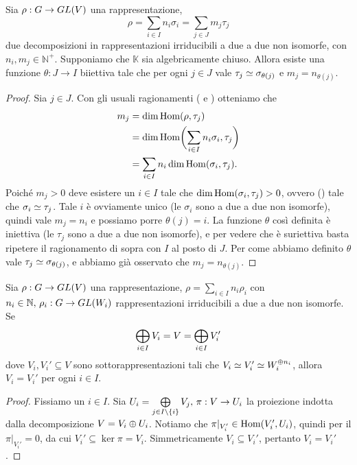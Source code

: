 \begin{proposition}
Sia $\rho:G\to GL(V)$ una rappresentazione,
$$
\rho=\sum_{i\in I}n_i\sigma_i=\sum_{j\in J}m_j\tau_j
$$
due decomposizioni in rappresentazioni irriducibili a due a due non isomorfe, con $n_i\comma m_j\in\mathbb{N}^+$. Supponiamo che $\mathbb{K}$ sia algebricamente chiuso. Allora esiste una funzione $\theta:J\to I$ biiettiva tale che per ogni $j\in J$ vale $\tau_j\simeq\sigma_{\theta(j)}$ e $m_j=n_{\theta(j)}$.
\end{proposition}
\begin{proof}
Sia $j\in J$. Con gli usuali ragionamenti ( e ) otteniamo che
\begin{align*}
m_j&=\dim\operatorname{Hom}(\rho,\tau_j)\\
&=\dim\operatorname{Hom}\biggl(\sum_{i\in I}n_i\sigma_i,\tau_j\biggr)\\
&=\sum_{i\in I}n_i\dim\operatorname{Hom}(\sigma_i,\tau_j).
\end{align*}
Poiché $m_j>0$ deve esistere un $i\in I$ tale che $\dim\operatorname{Hom}(\sigma_i,\tau_j)>0$, ovvero () tale che $\sigma_i\simeq\tau_j$. Tale $i$ è ovviamente unico (le $\sigma_i$ sono a due a due non isomorfe), quindi vale $m_j=n_i$ e possiamo porre $\theta(j)=i$. La funzione $\theta$ così definita è iniettiva (le $\tau_j$ sono a due a due non isomorfe), e per vedere che è suriettiva basta ripetere il ragionamento di sopra con $I$ al posto di $J$. Per come abbiamo definito $\theta$ vale $\tau_j\simeq\sigma_{\theta(j)}$, e abbiamo già osservato che $m_j=n_{\theta(j)}$.
\end{proof}

\begin{proposition}
Sia $\rho:G\to GL(V)$ una rappresentazione, $\rho=\sum_{i\in I}n_i\rho_i$ con $n_i\in\mathbb{N},\,\allowbreak\rho_i:G\to GL(W_i)$ rappresentazioni irriducibili a due a due non isomorfe. Se
$$
\bigoplus_{i\in I}V_i=V=\bigoplus_{i\in I}V_i'
$$
dove $V_i\comma V_i'\subseteq V$ sono sottorappresentazioni tali che $V_i\simeq V_i'\simeq W_i^{\oplus n_i}$, allora $V_i=V_i'$ per ogni $i\in I$.
\end{proposition}
\begin{proof}
Fissiamo un $i\in I$. Sia $U_i=\bigoplus\limits_{j\in I\setminus\{i\}}V_j,\,\allowbreak\pi:V\to U_i$ la proiezione indotta dalla decomposizione $V=V_i\oplus U_i$. Notiamo che $\pi|_{V_i'}\in\operatorname{Hom}(V_i',U_i)$, quindi per il  $\pi|_{V_i'}=0$, da cui $V_i'\subseteq\ker\pi=V_i$. Simmetricamente $V_i\subseteq V_i'$, pertanto $V_i=V_i'$.
\end{proof}


